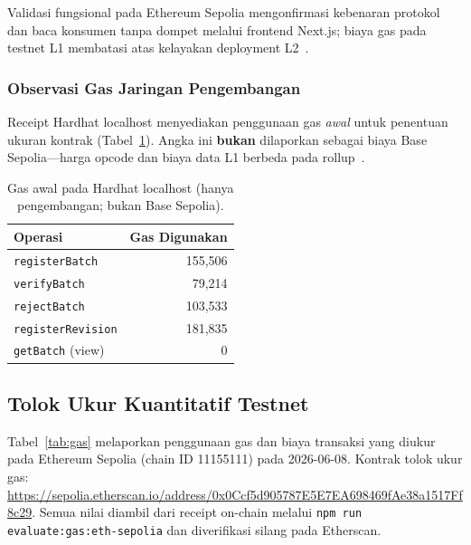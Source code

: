 Validasi fungsional pada Ethereum Sepolia mengonfirmasi kebenaran protokol dan baca konsumen tanpa dompet melalui frontend Next.js; biaya gas pada testnet L1 membatasi atas kelayakan deployment L2~\cite{optimism2024spec}.


\subsubsection{Observasi Gas Jaringan Pengembangan}
Receipt Hardhat localhost menyediakan penggunaan gas \emph{awal} untuk penentuan ukuran kontrak (Tabel~\ref{tab:gas-local}).
Angka ini \textbf{bukan} dilaporkan sebagai biaya Base Sepolia---harga opcode dan biaya data L1 berbeda pada rollup~\cite{optimism2024spec}.

\begin{table}[t]
  \caption{Gas awal pada Hardhat localhost (hanya pengembangan; bukan Base Sepolia).}
  \label{tab:gas-local}
  \centering
  \footnotesize
  \begin{tabularx}{\columnwidth}{@{}Xr@{}}
    \toprule
    \textbf{Operasi} & \textbf{Gas Digunakan} \\
    \midrule
    \texttt{registerBatch} & 155{,}506 \\
    \texttt{verifyBatch} & 79{,}214 \\
    \texttt{rejectBatch} & 103{,}533 \\
    \texttt{registerRevision} & 181{,}835 \\
    \texttt{getBatch} (view) & 0 \\
    \bottomrule
  \end{tabularx}
\end{table}

\subsection{Tolok Ukur Kuantitatif Testnet}
\label{sec:eval-b}

Tabel~\ref{tab:gas} melaporkan penggunaan gas dan biaya transaksi yang diukur pada Ethereum Sepolia (chain ID 11155111) pada 2026-06-08.
Kontrak tolok ukur gas: \url{https://sepolia.etherscan.io/address/0x0Ccf5d905787E5E7EA698469fAe38a1517Ff8c29}.
Semua nilai diambil dari receipt on-chain melalui \texttt{npm run evaluate:gas:eth-sepolia} dan diverifikasi silang pada Etherscan.

